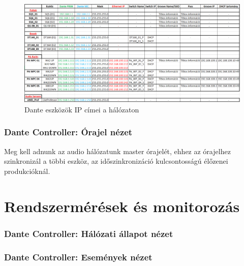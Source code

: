 \begin{figure}[!ht]
\centering
\includegraphics[width=150mm, keepaspectratio]{figures/Dante_IPs.png}
\caption{Dante eszközök IP címei a hálózaton}
\label{fig:Dante_IPs}
\end{figure}








\subsubsection{Dante Controller: Órajel nézet}

Meg kell adnunk az audio hálózatunk master órajelét, ehhez az órajelhez
szinkronizál a többi eszköz, az időszinkronizáció kulcsontosságú élőzenei
produkcióknál.



\section{Rendszermérések és monitorozás}



\subsubsection{Dante Controller: Hálózati állapot nézet}


\subsubsection{Dante Controller: Események nézet}





